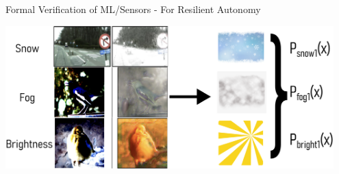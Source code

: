 \documentclass[t,compress,aspectratio=169]{beamer}
\begin{document}
\begin{frame}[fragile]{Formal Verification of ML/Sensors - For Resilient Autonomy}
%
%
%
%

\vspace{-0.2em}

\centering\includegraphics[width=0.95\textwidth]{img/guarantee-weather}

\end{frame}
\end{document}

